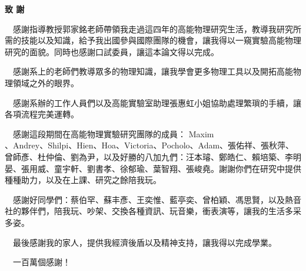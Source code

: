 
\begin{CJK}{UTF8}{bkai}

\checktoopen
\thispagestyle{plain}
\begin{center}
{\Huge \bfseries 致 謝 \par}
\end{center}
\bigskip
\bigskip
\bigskip
\bigskip
{\large 

　感謝指導教授郭家銘老師帶領我走過這四年的高能物理研究生活，教導我研究所需的技能以及知識，給予我出國參與國際團隊的機會，讓我得以一窺實驗高能物理研究的面貌。同時也感謝口試委員，讓這本論文得以完成。

　感謝系上的老師們教導眾多的物理知識，讓我學會更多物理工具以及開拓高能物理領域之外的眼界。

　感謝系辦的工作人員們以及高能實驗室助理張惠虹小姐協助處理繁瑣的手續，讓各項流程完美運轉。

　感謝這段期間在高能物理實驗研究團隊的成員：
Maxim\\、Andrey、Shilpi、Hien、Hoa、Victoria、Pocholo、Adam、張佑祥、張秋萍、曾師彥、杜仲倫、劉為尹，以及好勝的八加九們：汪本璿、鄭皓仁、賴培築、李明晏、張用威、童宇軒、劉書孝、徐郁瑜、葉智翔、張峻堯。謝謝你們在研究中提供種種助力，以及在上課、研究之餘陪我玩。

　感謝好同學們：蔡伯罕、蘇丰彥、王奕惟、藍亭奕、曾柏穎、馮思賢，以及熱音社的夥伴們，陪我玩、吵架、交換各種資訊、玩音樂，衝表演等，讓我的生活多采多姿。

　最後感謝我的家人，提供我經濟後盾以及精神支持，讓我得以完成學業。

　一百萬個感謝！
	

\par}


\end{CJK}

